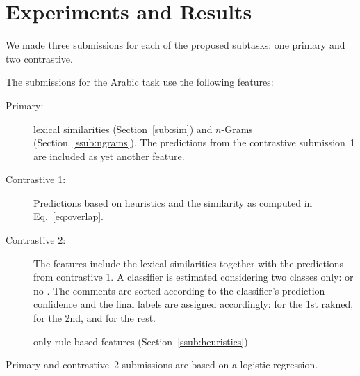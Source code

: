 \section{Experiments and Results}
\label{sec:experiments}

We made three submissions for each of the proposed subtasks: one primary and 
two contrastive. 

The submissions for the Arabic task use the following features:

\begin{description}
\item[Primary:] 
  lexical similarities (Section~\ref{sub:sim}) and  $n$-Grams 
  (Section~\ref{ssub:ngrams}). The predictions from the contrastive 
  submission~1 are included as yet another feature. 
\item[Contrastive 1:] 
  Predictions based on heuristics and the similarity as computed in 
  Eq.~\eqref{eq:overlap}.     
\item[Contrastive 2:] 
  The features include the lexical similarities together with the predictions 
  from contrastive 1. A classifier is estimated considering two classes only: 
  \dir or no-\dir. The comments are sorted according to the classifier's 
  prediction confidence and the final labels are assigned accordingly: \dir for 
  the 1st rakned, \rel for the 2nd, and \irel for the rest.
  
  
  only rule-based features 
(Section~\ref{ssub:heuristics}) 
\end{description}

Primary and contrastive~2 submissions are based on a logistic regression. 




